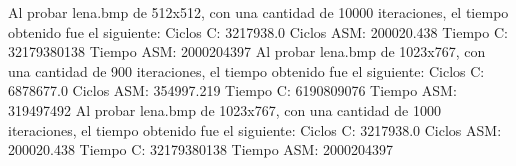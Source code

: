 \documentclass[10pt, a4paper]{article}
\begin{document}
\begin{itemize}
Al probar lena.bmp de 512x512, con una cantidad de 10000 iteraciones, el tiempo obtenido fue el siguiente:\newline
Ciclos C:                 3217938.0\newline
Ciclos ASM:               200020.438\newline
\newline
Tiempo C:                 32179380138\newline
Tiempo ASM:               2000204397\newline
\newline
Al probar lena.bmp de 1023x767, con una cantidad de 900 iteraciones, el tiempo obtenido fue el siguiente:\newline
Ciclos C:                 6878677.0\newline
Ciclos ASM:               354997.219\newline
\newline
Tiempo C:                 6190809076\newline
Tiempo ASM:               319497492\newline
\newline
Al probar lena.bmp de 1023x767, con una cantidad de 1000 iteraciones, el tiempo obtenido fue el siguiente:\newline
Ciclos C:                 3217938.0\newline
Ciclos ASM:               200020.438\newline
\newline
Tiempo C:                 32179380138\newline
Tiempo ASM:               2000204397\newline


\end{itemize}
\end{document}
